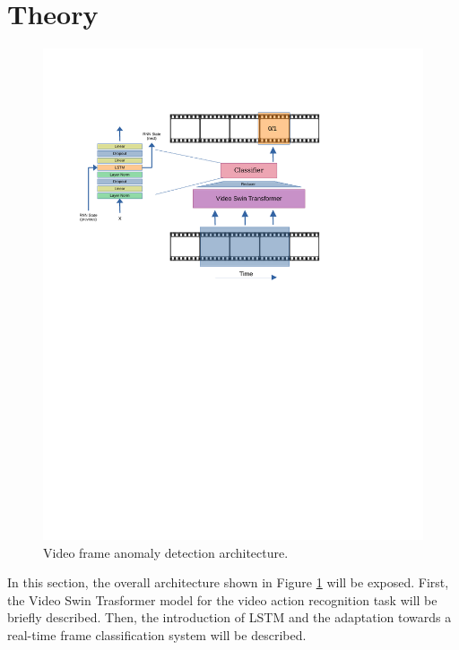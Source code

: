 \section{Theory}
\fboxsep=1mm%
\fboxrule=1pt%

\begin{figure}[t]
    \centering
        \includegraphics[trim=40 420 0 100, clip, width=1.\linewidth]{images/arch.pdf}
    \caption{Video frame anomaly detection architecture.}
    \label{fig:arch}
\end{figure}

In this section, the overall architecture shown in Figure \ref{fig:arch} will be exposed.
First, the Video Swin Trasformer \cite{liu_video_2022} model for the video action recognition task will be briefly described.
Then, the introduction of LSTM and the adaptation towards a real-time frame classification system will be described.

